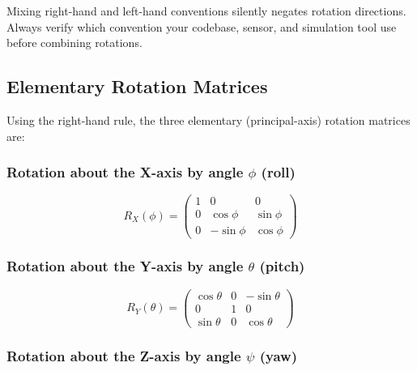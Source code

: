 \documentclass[12pt,a4paper]{article}
\begin{document}
\begin{warningbox}
Mixing right-hand and left-hand conventions silently negates rotation
directions. Always verify which convention your codebase, sensor, and
simulation tool use before combining rotations.
\end{warningbox}

\subsection{Elementary Rotation Matrices}

Using the right-hand rule, the three elementary (principal-axis) rotation
matrices are:

\subsubsection*{Rotation about the X-axis by angle $\phi$ (roll)}

\begin{equation}
  R_X(\phi) = \begin{pmatrix}
    1 & 0          & 0           \\
    0 & \cos\phi  & \sin\phi   \\
    0 & -\sin\phi & \cos\phi
  \end{pmatrix}
  \label{eq:Rx}
\end{equation}

\subsubsection*{Rotation about the Y-axis by angle $\theta$ (pitch)}

\begin{equation}
  R_Y(\theta) = \begin{pmatrix}
    \cos\theta  & 0 & -\sin\theta \\
    0            & 1 & 0            \\
    \sin\theta  & 0 & \cos\theta
  \end{pmatrix}
  \label{eq:Ry}
\end{equation}

\subsubsection*{Rotation about the Z-axis by angle $\psi$ (yaw)}
\end{document}
